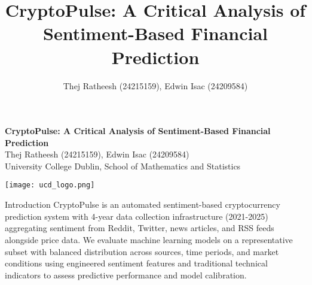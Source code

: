 \documentclass[final]{beamer}
\title{CryptoPulse: A Critical Analysis of Sentiment-Based Financial Prediction}
\author{Thej Ratheesh (24215159), Edwin Isac (24209584)}
\institute{University College Dublin, School of Mathematics and Statistics}
\begin{document}
\begin{frame}[t]


\vspace{1cm}
\begin{center}
    {\large\bfseries CryptoPulse: A Critical Analysis of Sentiment-Based Financial Prediction}\\[0.3cm]
    {\normalsize Thej Ratheesh (24215159), Edwin Isac (24209584)}\\[0.1cm]
    {\small University College Dublin, School of Mathematics and Statistics}
\end{center}

\vspace{-4.5cm}
\hfill\texttt{[image: ucd\_logo.png]}
\vspace{0.5cm}

\begin{block}{Introduction}
    \normalsize
    CryptoPulse is an automated sentiment-based cryptocurrency prediction system with 4-year data collection infrastructure (2021-2025) aggregating sentiment from Reddit, Twitter, news articles, and RSS feeds alongside price data. We evaluate machine learning models on a representative subset with balanced distribution across sources, time periods, and market conditions using engineered sentiment features and traditional technical indicators to assess predictive performance and model calibration.
\end{block}


\end{frame}
\end{document}
